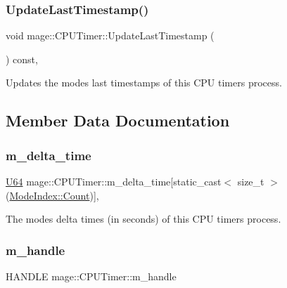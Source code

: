 \subsubsection{\texorpdfstring{Update\+Last\+Timestamp()}{UpdateLastTimestamp()}}
{\footnotesize\ttfamily void mage\+::\+C\+P\+U\+Timer\+::\+Update\+Last\+Timestamp (\begin{DoxyParamCaption}{ }\end{DoxyParamCaption}) const\hspace{0.3cm}{\ttfamily [private]}, {\ttfamily [noexcept]}}

Updates the modes\textquotesingle{} last timestamps of this C\+PU timer\textquotesingle{}s process. 

\subsection{Member Data Documentation}
\hypertarget{classmage_1_1_c_p_u_timer_a2ce9eda81a57934b172b426238d4587d}{}\label{classmage_1_1_c_p_u_timer_a2ce9eda81a57934b172b426238d4587d} 
\subsubsection{\texorpdfstring{m\+\_\+delta\+\_\+time}{m\_delta\_time}}
{\footnotesize\ttfamily \hyperlink{namespacemage_a6672cf3c861707ce4a3235a3eb43941d}{U64} mage\+::\+C\+P\+U\+Timer\+::m\+\_\+delta\+\_\+time\mbox{[}static\+\_\+cast$<$ size\+\_\+t $>$(\hyperlink{classmage_1_1_c_p_u_timer_a98d59db3c396b14269c937e016c7625eae93f994f01c537c4e2f7d8528c3eb5e9}{Mode\+Index\+::\+Count})\mbox{]}\hspace{0.3cm}{\ttfamily [mutable]}, {\ttfamily [private]}}

The modes\textquotesingle{} delta times (in seconds) of this C\+PU timer\textquotesingle{}s process. \hypertarget{classmage_1_1_c_p_u_timer_a95b8ac18c050ed25293c8a923087369a}{}\label{classmage_1_1_c_p_u_timer_a95b8ac18c050ed25293c8a923087369a} 
\subsubsection{\texorpdfstring{m\+\_\+handle}{m\_handle}}
{\footnotesize\ttfamily H\+A\+N\+D\+LE mage\+::\+C\+P\+U\+Timer\+::m\+\_\+handle\hspace{0.3cm}{\ttfamily [private]}}


